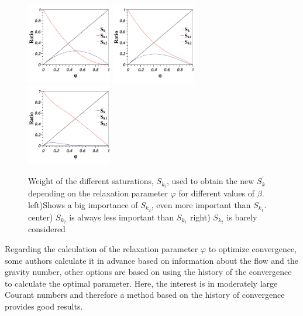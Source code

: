 \begin{figure}[h!]
{\includegraphics[width=0.33\textwidth]{figures/phi_ratio_0.png}}
{\includegraphics[width=0.33\textwidth]{figures/phi_ratio_04.png}}
{\includegraphics[width=0.33\textwidth]{figures/phi_ratio_5.png}}
\caption{Weight of the different saturations, $S_{k_i}$, used to obtain the new ${S^\prime_k}$ depending on the relaxation parameter $\varphi$ for different values of $\beta.$ left)Shows a big importance of $S_{k_2}$, even more important than $S_{k_1}$. center) $S_{k_2}$ is always less important than $S_{k_1}$ right) $S_{k_2}$ is barely considered}
    \label{fig:alpha_ratio}
\end{figure} 

Regarding the calculation of the relaxation parameter $\varphi$ to optimize convergence, some authors calculate it in advance based on information about the flow and the gravity number, other options are based on using the history of the convergence to calculate the optimal parameter. Here, the interest is in moderately large Courant numbers and therefore a method based on the history of convergence provides good results. 


